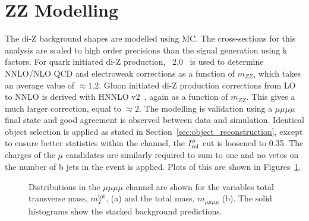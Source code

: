 \section{ZZ Modelling}
\label{sec:zz_modelling}

The di-Z background shapes are modelled using \ac{MC}.
The cross-sections for this analysis are scaled to high order precisions than the signal generation using k factors.
For quark initiated di-Z production, \POWHEG~2.0~\cite{Nason:2004rx,Frixione:2007vw,Alioli:2010xd,Jezo:2015aia} is used to determine \ac{NNLO}/\ac{NLO} \ac{QCD} and electroweak corrections as a function of $m_{ZZ}$, which takes an average value of $\approx 1.2$.
Gluon initiated di-Z production corrections from \ac{LO} to \ac{NNLO} is derived with HNNLO v2~\cite{PhysRevLett.98.222002}, again as a function of $m_{ZZ}$.
This gives a much larger correction, equal to $\approx 2$.
The modelling is validation using a $\mu\mu\mu\mu$ final state and good agreement is observed between data and simulation.
Identical object selection is applied as stated in Section~\ref{sec:object_reconstruction}, except to ensure better statistics within the channel, the $I_{\text{rel}}^{\mu}$ cut is loosened to 0.35.
The charges of the $\mu$ candidates are similarly required to sum to one and no vetos on the number of b jets in the event is applied.
Plots of this are shown in Figures~\ref{fig:4tau_mmmm}. \\

\begin{figure}[!hbtp]
\centering
\caption{Distributions in the $\mu\mu\mu\mu$ channel are shown for the variables total transverse mass, $m_{T}^{\text{tot}}$, (a) and the total mass, $m_{\mu\mu\mu\mu}$ (b). The solid histograms show the stacked background predictions.}
\label{fig:4tau_mmmm}
\end{figure}



